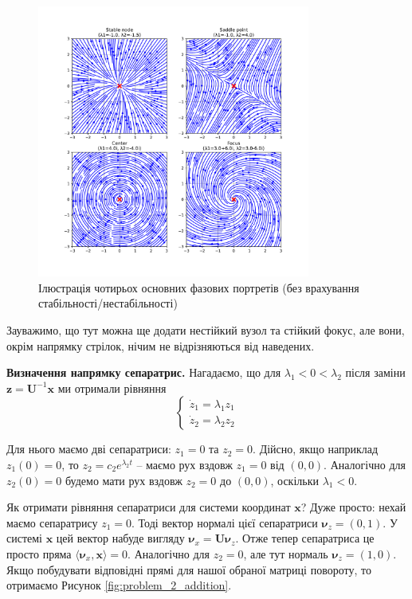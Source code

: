 \documentclass[oneside,solution]{tmpl}
\begin{document}
\begin{figure}[H]
    \centering
    \includegraphics[width=0.8\textwidth]{images/exam/exam_problem_2.pdf}
    \caption{Ілюстрація чотирьох основних фазових портретів (без врахування стабільності/нестабільності)}
    \label{fig:problem_2_illustration}
\end{figure}

Зауважимо, що тут можна ще додати нестійкий вузол та стійкий фокус, але вони, окрім напрямку стрілок, нічим не відрізняються від наведених.

\textbf{Визначення напрямку сепаратрис.} Нагадаємо, що для $\lambda_1 < 0 < \lambda_2$ після заміни $\mathbf{z} = \boldsymbol{U}^{-1}\mathbf{x}$ ми отримали рівняння 
\begin{equation}
    \begin{cases}
        \dot{z}_1 = \lambda_1 z_1 \\
        \dot{z}_2 = \lambda_2 z_2
    \end{cases}
\end{equation}

Для нього маємо дві сепаратриси: $z_1=0$ та $z_2=0$. Дійсно, якщо наприклад $z_1(0)=0$, то $z_2 = c_2e^{\lambda_2 t}$ -- маємо рух вздовж $z_1=0$ від $(0,0)$. Аналогічно для $z_2(0)=0$ будемо мати рух вздовж $z_2=0$ до $(0,0)$, оскільки $\lambda_1<0$.

Як отримати рівняння сепаратриси для системи координат $\mathbf{x}$? Дуже просто: нехай маємо сепаратрису $z_1=0$. Тоді вектор нормалі цієї сепаратриси $\boldsymbol{\nu}_z = (0,1)$. У системі $\mathbf{x}$ цей вектор набуде вигляду $\boldsymbol{\nu}_x = \boldsymbol{U}\boldsymbol{\nu}_z$. Отже тепер сепаратриса це просто пряма $\langle \boldsymbol{\nu}_x, \mathbf{x} \rangle = 0$. Аналогічно для $z_2=0$, але тут нормаль $\boldsymbol{\nu}_z = (1, 0)$. Якщо побудувати відповідні прямі для нашої обраної матриці повороту, то отримаємо Рисунок \ref{fig:problem_2_addition}.
\end{document}

